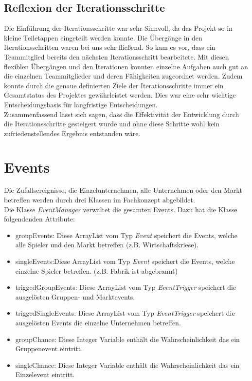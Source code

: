 \subsection{Reflexion der Iterationsschritte}
Die Einführung der Iterationsschritte war sehr Sinnvoll, da das Projekt so in kleine Teiletappen eingeteilt werden konnte. Die Übergänge in den Iterationsschritten waren bei uns sehr fließend. So kam es vor, dass ein Teammitglied bereits den nächsten Iterationsschritt bearbeitete. Mit diesen flexiblen Übergängen und den Iterationen konnten einzelne Aufgaben auch gut an die einzelnen Teammitglieder und deren Fähigkeiten zugeordnet werden. Zudem konnte durch die genaue definierten Ziele der Iterationsschritte immer ein Gesamtstatus des Projektes gewährleistet werden. Dies war eine sehr wichtige Entscheidungsbasis für langfristige Entscheidungen.\\
Zusammenfassend lässt sich sagen, dass die Effektivität der Entwicklung durch die Iterationsschritte gesteigert wurde und ohne diese Schritte wohl kein zufriedenstellendes Ergebnis entstanden wäre.

\section{Events}
Die Zufallsereignisse, die Einzelunternehmen, alle Unternehmen oder den Markt betreffen werden durch drei Klassen im Fachkonzept abgebildet. \\
Die Klasse \textit{EventManager} verwaltet die gesamten Events. Dazu hat die Klasse folgendenden Attribute:
\begin{itemize}
\item groupEvents: Diese ArrayList vom Typ \textit{Event} speichert die Events, welche alle Spieler und den Markt betreffen (z.B. Wirtschaftskriese).
\item singleEvents:Diese ArrayList vom Typ \textit{Event} speichert die Events, welche einzelne Spieler betreffen. (z.B. Fabrik ist abgebrannt)
\item triggedGroupEvents: Diese ArrayList vom Typ \textit{EventTrigger} speichert die ausgelösten Gruppen- und Marktevents.
\item triggedSingleEvents: Diese ArrayList vom Typ \textit{EventTrigger} speichert die ausgelösten Events die einzelne Unternehmen betreffen.
\item groupChance: Diese Integer Variable enthält die Wahrscheinlichkeit das ein Gruppenevent eintritt.
\item singleChance: Diese Integer Variable enthält die Wahrscheinlichkeit das ein Einzelevent eintritt.
\end{itemize}

